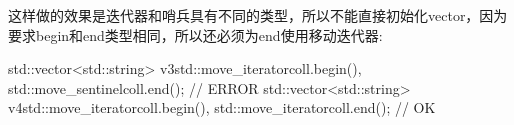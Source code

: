 这样做的效果是迭代器和哨兵具有不同的类型，所以不能直接初始化vector，因为要求begin和end类型相同，所以还必须为end使用移动迭代器:

\begin{cpp}
std::vector<std::string> v3{std::move_iterator{coll.begin()},
							std::move_sentinel{coll.end()}}; // ERROR
std::vector<std::string> v4{std::move_iterator{coll.begin()},
							std::move_iterator{coll.end()}}; // OK
\end{cpp}















